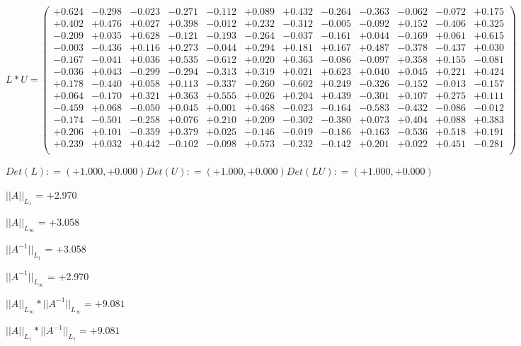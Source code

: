 \documentclass[9pt]{article}
\theoremstyle{plain}
\theoremstyle{definition}
\theoremstyle{remark}
\numberwithin{equation}{section}
\begin{document}
$L * U  = \left(
\begin{array}{
cccccccccccc}
+0.624 & -0.298 & -0.023 & -0.271 & -0.112 & +0.089 & +0.432 & -0.264 & -0.363 & -0.062 & -0.072 & +0.175 \\
+0.402 & +0.476 & +0.027 & +0.398 & -0.012 & +0.232 & -0.312 & -0.005 & -0.092 & +0.152 & -0.406 & +0.325 \\
-0.209 & +0.035 & +0.628 & -0.121 & -0.193 & -0.264 & -0.037 & -0.161 & +0.044 & -0.169 & +0.061 & +0.615 \\
-0.003 & -0.436 & +0.116 & +0.273 & -0.044 & +0.294 & +0.181 & +0.167 & +0.487 & -0.378 & -0.437 & +0.030 \\
-0.167 & -0.041 & +0.036 & +0.535 & -0.612 & +0.020 & +0.363 & -0.086 & -0.097 & +0.358 & +0.155 & -0.081 \\
-0.036 & +0.043 & -0.299 & -0.294 & -0.313 & +0.319 & +0.021 & +0.623 & +0.040 & +0.045 & +0.221 & +0.424 \\
+0.178 & -0.440 & +0.058 & +0.113 & -0.337 & -0.260 & -0.602 & +0.249 & -0.326 & -0.152 & -0.013 & -0.157 \\
+0.064 & -0.170 & +0.321 & +0.363 & +0.555 & +0.026 & +0.204 & +0.439 & -0.301 & +0.107 & +0.275 & +0.111 \\
-0.459 & +0.068 & -0.050 & +0.045 & +0.001 & +0.468 & -0.023 & -0.164 & -0.583 & -0.432 & -0.086 & -0.012 \\
-0.174 & -0.501 & -0.258 & +0.076 & +0.210 & +0.209 & -0.302 & -0.380 & +0.073 & +0.404 & +0.088 & +0.383 \\
+0.206 & +0.101 & -0.359 & +0.379 & +0.025 & -0.146 & -0.019 & -0.186 & +0.163 & -0.536 & +0.518 & +0.191 \\
+0.239 & +0.032 & +0.442 & -0.102 & -0.098 & +0.573 & -0.232 & -0.142 & +0.201 & +0.022 & +0.451 & -0.281 \\
\end{array}
\right)$ \newline 

$Det(L) :    = (+1.000,+0.000)     Det(U) :    = (+1.000,+0.000)     Det(LU) :    = (+1.000,+0.000)$

$||A||_{L_1}$  = +2.970

$||A||_{L_{\infty}}$ = +3.058

$||A^{-1}||_{L_1}$  = +3.058

$||A^{-1}||_{L_{\infty}}$ = +2.970

$||A||_{L_{\infty}} * ||A^{-1}||_{L_{\infty}} = +9.081$

$||A||_{L_1} * ||A^{-1}||_{L_1} = +9.081$
\end{document}
